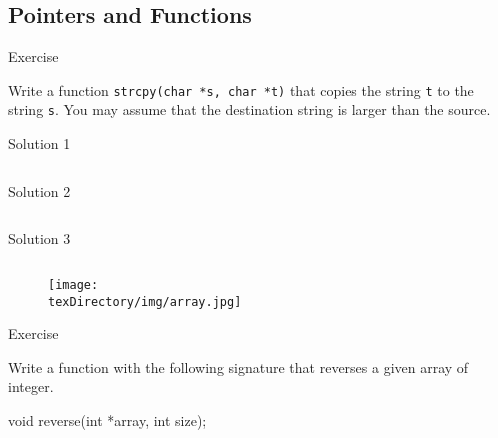 \documentclass[compress]{beamer}
\begin{document}
\subsection{Pointers and Functions}

\begin{slide}
	\begin{block}{Exercise}

	Write a function \texttt{strcpy(char *s, char *t)} that copies the string \texttt{t} to the string \texttt{s}.
	You may assume that the destination string is larger than the source.

	\end{block}
\end{slide}

\begin{slide}
	\begin{block}{Solution 1}

	\inputminted[fontsize=\scriptsize, firstline=10, linenos]{c}{
		\resDirectory/ls11-strcpy1.c
	}

	\end{block}
\end{slide}

\begin{slide}
	\begin{block}{Solution 2}

	\inputminted[fontsize=\scriptsize, firstline=10, linenos]{c}{
		\resDirectory/ls11-strcpy2.c
	}

	\end{block}
\end{slide}

\begin{slide}
	\begin{block}{Solution 3}

	\inputminted[fontsize=\scriptsize, firstline=10, linenos]{c}{
		\resDirectory/ls11-strcpy3.c
	}

	\end{block}
\end{slide}

\begin{slide}
	\begin{figure}
	\texttt{[image: \\texDirectory/img/array.jpg]}
	\end{figure}
\end{slide}

\begin{slide}
	\begin{block}{Exercise}

	Write a function with the following signature that reverses a given array of integer.

	\begin{terminal}
	void reverse(int *array, int size);
	\end{terminal}

	\end{block}
\end{slide}
\end{document}
